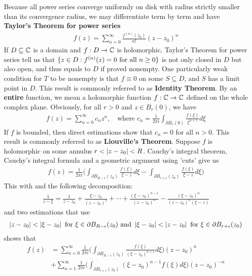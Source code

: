 \documentclass{report}
\begin{document}
Because all power series converge uniformly on disk with radius strictly smaller than its convergence radius, we may differentiate term by term and have \textbf{Taylor's Theorem for power series} 
\begin{align*}
f(z)= \sum_{n=0}^{\infty} \frac{f^{(n)}(z_0)}{n!}(z-z_0)^n
\end{align*}
If $D\subseteq \mathbb{C}$ is a domain and $f:D\rightarrow \mathbb{C}$ is holomorphic, Taylor's Theorem for power series tell us that $\{ z\in D: f^{(n)}(z)=0\text{ for all }n\geq 0 \}$ is not only closed in $D$ but also open, and thus equals to $D$ if proved nonempty. One particularly weak condition for $T$ to be nonempty  is that $f\equiv 0$ on some $S \subseteq D$, and $S$ has a limit point in  $D$. This result is commonly referred to as \textbf{Identity Theorem}. By an \textbf{entire} function, we mean a holomorphic function $f:\mathbb{C}\rightarrow \mathbb{C}$ defined on the whole complex plane. Obviously, for all $r>0$ and $z \in B_r(0)$, we have 
\begin{align*}
f(z)= \sum_{n=0}^{\infty}c_nz^n,\quad\text{where }c_n=\frac{1}{2\pi i} \int_{\partial B_r(0)} \frac{f(\xi)}{\xi^{n+1}}d\xi
\end{align*}
If $f$ is bounded, then direct estimations show that $c_n=0$ for all $n>0$. This result is commonly referred to as \textbf{Liouville's Theorem}. Suppose $f$ is holomorphic on some annulus $r<\left|z-z_0\right|<R$. Cauchy's integral theorem, Cauchy's integral formula and a geometric argument using 'cuts' give us 
\begin{align*}
f(z)= \frac{1}{2\pi  i} \Big(\int_{\partial B_{R- \epsilon }(z_0)} \frac{f(\xi)}{\xi - z}d\xi - \int_{\partial B_{r+\epsilon }(z_0)} \frac{f(\xi)}{\xi -z}d\xi  \Big)
\end{align*}
This with  and the following decomposition: 
\begin{align*}
\frac{1}{z-\xi}= \frac{1}{z-z_0}+ \frac{\xi - z_0}{(z-z_0)^2}+ \cdots + \frac{(\xi -z_0)^{n-1}}{(z-z_0)^n} - \frac{(\xi - z_0)^n}{(z-z_0)^n (\xi -z)}
\end{align*}
and two estimations that use 
\begin{align*}
\left|z-z_0\right|< \left|\xi - z_0\right|\text{ for }\xi \in \partial B_{R-\epsilon} (z_0)\text{ and } \left|\xi - z_0\right| < \left|z-z_0\right| \text{ for }\xi \in \partial B_{r+\epsilon } (z_0)
\end{align*}
shows that 
\begin{align*}
f(z)&= \sum_{n=0}^{\infty} \frac{1}{2\pi  i}\Big( \int_{\partial  B_{R- \epsilon }(z_0)} \frac{f(\xi)}{(\xi - z_0)^{n+1}}d\xi \Big) (z-z_0)^n \\
&+ \sum_{n=1}^{\infty} \frac{1}{2\pi i}\Big( \int_{\partial B_{r+\epsilon }(z_0)} (\xi- z_0)^{n-1}f(\xi)d \xi \Big)(z-z_0)^{-n}
\end{align*}
\end{document}
